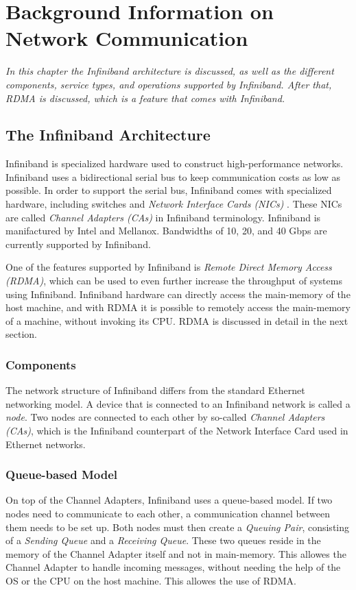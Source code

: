 \chapter{Background Information on Network Communication}

\textit{In this chapter the Infiniband architecture is discussed, as well as the different components, service types, and operations supported by Infiniband. After that, RDMA is discussed, which is a feature that comes with Infiniband.}

\section{The Infiniband Architecture}
Infiniband \cite{infiniband, infiniband2000infiniband} is specialized hardware used to construct high-performance networks. Infiniband uses a bidirectional serial bus to keep communication costs as low as possible. In order to support the serial bus, Infiniband comes with specialized hardware, including switches and \emph{Network Interface Cards (NICs)} \cite{pfister2001introduction}. These NICs are called \emph{Channel Adapters (CAs)} in Infiniband terminology. Infiniband is manifactured by Intel and Mellanox. Bandwidths of 10, 20, and 40 Gbps are currently supported by Infiniband.

One of the features supported by Infiniband is \emph{Remote Direct Memory Access (RDMA)}, which can be used to even further increase the throughput of systems using Infiniband. Infiniband hardware can directly access the main-memory of the host machine, and with RDMA it is possible to remotely access the main-memory of a machine, without invoking its CPU. RDMA is discussed in detail in the next section.

\subsection{Components}
The network structure of Infiniband differs from the standard Ethernet networking model. A device that is connected to an Infiniband network is called a \emph{node}. Two nodes are connected to each other by so-called \emph{Channel Adapters (CAs)}, which is the Infiniband counterpart of the Network Interface Card used in Ethernet networks. 

\subsection{Queue-based Model}
On top of the Channel Adapters, Infiniband uses a queue-based model. If two nodes need to communicate to each other, a communication channel between them needs to be set up. Both nodes must then create a \emph{Queuing Pair}, consisting of a \emph{Sending Queue} and a \emph{Receiving Queue}. These two queues reside in the memory of the Channel Adapter itself and not in main-memory. This allowes the Channel Adapter to handle incoming messages, without needing the help of the OS or the CPU on the host machine. This allowes the use of RDMA.

